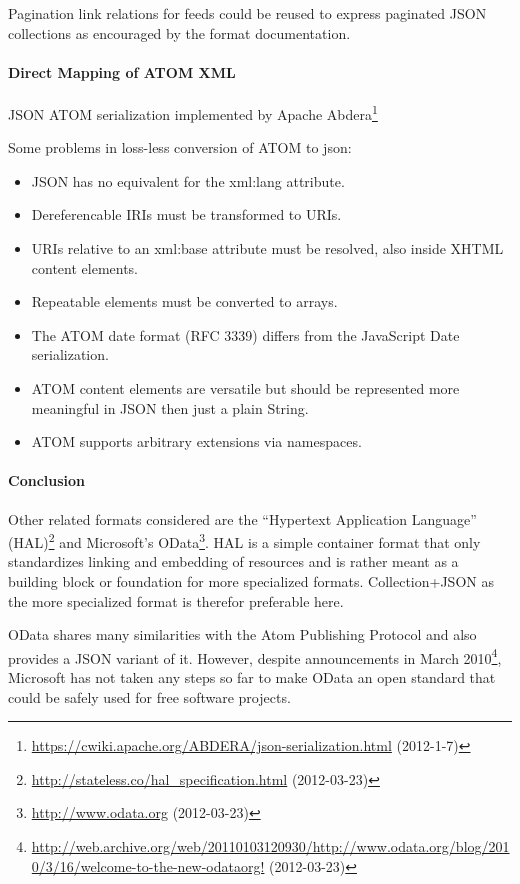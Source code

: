 \documentclass[12pt,a4paper,twoside]{scrartcl}		%
\newcommand{\citeurl}[2]{\url{#1} (#2)}
\begin{document}
Pagination link relations for feeds\cite{RFC5005} could be reused to express
paginated JSON collections as encouraged by the format
documentation\cite[sec. 5.5]{Amundsen2011a}.



\paragraph{Direct Mapping of ATOM XML}
JSON ATOM serialization implemented by Apache
Abdera\footnote{\cite{Snell2008}
  \citeurl{https://cwiki.apache.org/ABDERA/json-serialization.html}{2012-1-7}}

Some problems in loss-less conversion of ATOM to json:\cite{Snell2008}
\begin{itemize}
  \item JSON has no equivalent for the xml:lang attribute.
  \item Dereferencable IRIs must be transformed to URIs.
  \item URIs relative to an xml:base attribute must be resolved, also inside XHTML content elements.
  \item Repeatable elements must be converted to arrays.
  \item The ATOM date format (RFC 3339) differs from the JavaScript Date serialization.
  \item ATOM content elements are versatile but should be represented more meaningful in JSON then just a plain String.
  \item ATOM supports arbitrary extensions via namespaces.
\end{itemize}

\paragraph{Conclusion}

Other related formats considered are the ``Hypertext Application Language''
(HAL)\footnote{\citeurl{http://stateless.co/hal_specification.html}{2012-03-23}}
and Microsoft's OData\footnote{\citeurl{http://www.odata.org}{2012-03-23}}. HAL
is a simple container format that only standardizes linking and embedding of
resources and is rather meant as a building block or foundation for more
specialized formats. Collection+JSON as the more specialized format is therefor
preferable here.

OData shares many similarities with the Atom Publishing Protocol and also
provides a JSON variant of it. However, despite announcements in March
2010\footnote{\citeurl{http://web.archive.org/web/20110103120930/http://www.odata.org/blog/2010/3/16/welcome-to-the-new-odataorg!}{2012-03-23}},
Microsoft has not taken any steps so far to make OData an open standard that
could be safely used for free software projects.
\end{document}
